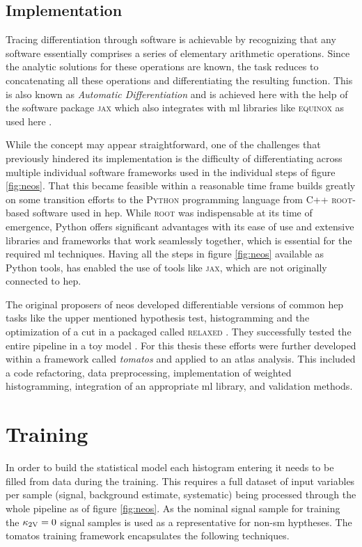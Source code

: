 \subsection{Implementation}
Tracing differentiation through software is achievable by recognizing that any software essentially comprises a series of elementary arithmetic operations. Since the analytic solutions for these operations are known, the task reduces to concatenating all these operations and differentiating the resulting function. This is also known as \textit{Automatic Differentiation} and is achieved here with the help of the software package \textsc{jax} \citep{jax2018github} which also  integrates with \ac{ml} libraries like \textsc{equinox} as used here \citep{kidger2021equinox}.

While the concept may appear straightforward, one of the challenges that previously hindered its implementation is the difficulty of differentiating across multiple individual software frameworks used in the individual steps of figure \ref{fig:neos}. That this became feasible within a reasonable time frame builds greatly on some transition efforts to the \textsc{Python} programming language from C++ \textsc{root}-based software \citep{ANTCHEVA20092499} used in \ac{hep}. While \textsc{root} was indispensable at its time of emergence, Python offers significant advantages with its ease of use and extensive libraries and frameworks that work seamlessly together, which is essential for the required \ac{ml} techniques. Having all the steps in figure \ref{fig:neos} available as Python tools, has enabled the use of tools like \textsc{jax}, which are not originally connected to \ac{hep}.

The original proposers \citet{Simpson_2023} of \ac{neos} developed differentiable versions of common \ac{hep} tasks like the upper mentioned hypothesis test, histogramming and the optimization of a cut in a packaged called \textsc{relaxed} \citep{Simpson_relaxed_version_0_3_0_2023}. They successfully tested the entire pipeline in a toy model \citep{Simpson_neos_version_0_2_0_2021}. For this thesis these efforts were further developed within a framework called \textit{\acf{tomatos}} \citep{tomatos} and applied to an \ac{atlas} analysis. This included a code refactoring, data preprocessing, implementation of weighted histogramming, integration of an appropriate \ac{ml} library, and validation methods.


\section{Training}\label{sec:neos_training}
In order to build the statistical model each histogram entering it needs to be filled from data during the training. This requires a full dataset of input variables per sample (signal, background estimate, systematic) being processed through the whole pipeline as of figure \ref{fig:neos}. As the nominal signal sample for training the $\kappa_{\text{2V}}=0$ signal samples is used as a representative for non-\ac{sm} \ktwov hyptheses. The \ac{tomatos} \citep{tomatos} training framework encapsulates the following techniques.

